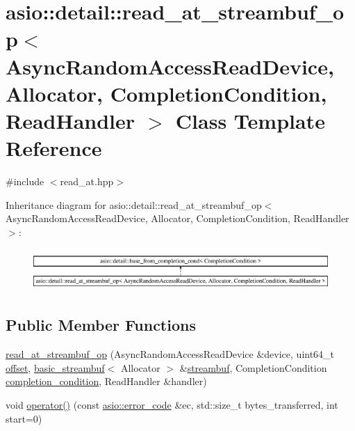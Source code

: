 \hypertarget{classasio_1_1detail_1_1read__at__streambuf__op}{}\section{asio\+:\+:detail\+:\+:read\+\_\+at\+\_\+streambuf\+\_\+op$<$ Async\+Random\+Access\+Read\+Device, Allocator, Completion\+Condition, Read\+Handler $>$ Class Template Reference}
\label{classasio_1_1detail_1_1read__at__streambuf__op}


{\ttfamily \#include $<$read\+\_\+at.\+hpp$>$}

Inheritance diagram for asio\+:\+:detail\+:\+:read\+\_\+at\+\_\+streambuf\+\_\+op$<$ Async\+Random\+Access\+Read\+Device, Allocator, Completion\+Condition, Read\+Handler $>$\+:\begin{figure}[H]
\begin{center}
\leavevmode
\includegraphics[height=1.613833cm]{classasio_1_1detail_1_1read__at__streambuf__op}
\end{center}
\end{figure}
\subsection*{Public Member Functions}
\begin{DoxyCompactItemize}
\item 
\hyperlink{classasio_1_1detail_1_1read__at__streambuf__op_a51fe77725685ac4b978bd80c5c6a7db8}{read\+\_\+at\+\_\+streambuf\+\_\+op} (Async\+Random\+Access\+Read\+Device \&device, uint64\+\_\+t \hyperlink{group__async__read__at_ga8dcdb41a4adfd6fe5322b5dd666d9f29}{offset}, \hyperlink{classasio_1_1basic__streambuf}{basic\+\_\+streambuf}$<$ Allocator $>$ \&\hyperlink{namespaceasio_a6a7ba348943527312eeace3492bf32ee}{streambuf}, Completion\+Condition \hyperlink{group__async__read_gae2e215d5013596cc2b385bb6c13fa518}{completion\+\_\+condition}, Read\+Handler \&handler)
\item 
void \hyperlink{classasio_1_1detail_1_1read__at__streambuf__op_a0ab130b8f14c9d8a9600881766321ef2}{operator()} (const \hyperlink{classasio_1_1error__code}{asio\+::error\+\_\+code} \&ec, std\+::size\+\_\+t bytes\+\_\+transferred, int start=0)
\end{DoxyCompactItemize}
